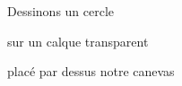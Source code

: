\documentclass[preview]{standalone}
\begin{document}
\begin{center}
Dessinons un cercle

sur un calque transparent

placé par dessus notre canevas
\end{center}
\end{document}
